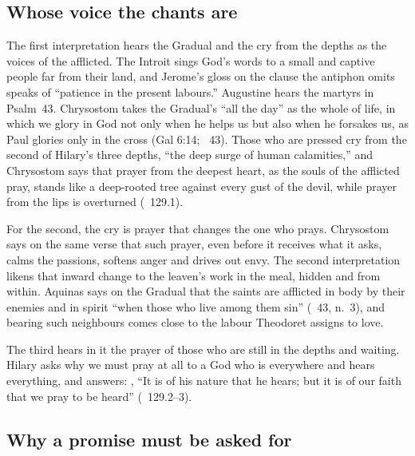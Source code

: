 \subsection{Whose voice the chants are}

The first interpretation hears the Gradual and the cry from the depths as the
voices of the afflicted. The Introit sings God's words to a small and captive
people far from their land, and Jerome's gloss on the clause the antiphon
omits speaks of ``patience in the present labours.'' Augustine hears the
martyrs in Psalm~43. Chrysostom takes the Gradual's ``all the day'' as the
whole of life, in which we glory in God not only when he helps us but also
when he forsakes us, as Paul glories only in the cross (Gal 6:14;
~43). Those who are pressed cry from the second of
Hilary's three depths, ``the deep surge of human calamities,'' and Chrysostom
says that prayer from the deepest heart, as the souls of the afflicted pray,
stands like a deep-rooted tree against every gust of the devil, while prayer
from the lips is overturned (~129.1).

For the second, the cry is prayer that changes the one who prays. Chrysostom
says on the same verse that such prayer, even before it receives what it asks,
calms the passions, softens anger and drives out envy. The second
interpretation likens that inward change to the leaven's work in the meal,
hidden and from within. Aquinas says on
the Gradual that the saints are afflicted in body by their enemies and in
spirit ``when those who live among them sin'' (~43,
n.~3), and bearing such neighbours comes close to the labour Theodoret assigns
to love.

The third hears in it the prayer of those who are still in the depths and
waiting. Hilary asks why we must pray at all to a God who is everywhere and
hears everything, and answers: , ``It is of his nature that he hears; but it
is of our faith that we pray to be heard'' (~129.2--3).

\subsection{Why a promise must be asked for}

